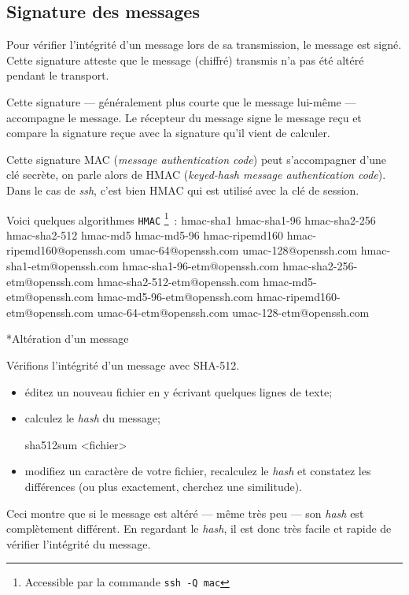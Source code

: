 \documentclass[a4paper,11pt]{article}
\begin{document}
\subsection{Signature des messages}
\label{signature}

Pour vérifier l'intégrité d'un message lors de sa transmission, le message est
signé. Cette signature atteste que le message (chiffré) transmis n'a pas été
altéré pendant le transport. 

Cette signature — généralement plus courte que le message lui-même — accompagne
le message. Le récepteur du message signe le message reçu et compare la
signature reçue avec la signature qu'il vient de calculer. 

Cette signature MAC (\textit{message authentication code}) peut s'accompagner
d'une clé secrète, on parle alors de HMAC (\textit{keyed-hash message
authentication code}). Dans le cas de \textit{ssh}, c'est bien HMAC qui est
utilisé avec la clé de session. 

Voici quelques algorithmes \texttt{HMAC}
\footnote{Accessible par la commande \texttt{ssh -Q mac}}~:
hmac-sha1 hmac-sha1-96 hmac-sha2-256 hmac-sha2-512 hmac-md5 hmac-md5-96
hmac-ripemd160 hmac-ripemd160@openssh.com umac-64@openssh.com
umac-128@openssh.com hmac-sha1-etm@openssh.com hmac-sha1-96-etm@openssh.com
hmac-sha2-256-etm@openssh.com hmac-sha2-512-etm@openssh.com
hmac-md5-etm@openssh.com hmac-md5-96-etm@openssh.com
hmac-ripemd160-etm@openssh.com umac-64-etm@openssh.com umac-128-etm@openssh.com


\begin{Exercice}*{Altération d'un message}

	Vérifions l'intégrité d'un message avec SHA-512. 

	\begin{itemize}
	
		\item éditez un nouveau fichier en y écrivant quelques lignes de texte;
		\item calculez le \textit{hash} du message; 

			\begin{term}
				sha512sum <fichier>
			\end{term}

		\item modifiez un caractère de votre fichier, recalculez le
			\textit{hash} et constatez les différences (ou plus exactement,
			cherchez une similitude).
	\end{itemize}

	Ceci montre que si le message est altéré — même très peu — son \textit{hash}
	est complètement différent. En regardant le \textit{hash}, il est donc très
	facile et rapide de vérifier l'intégrité du message. 

\end{Exercice}
\end{document}
